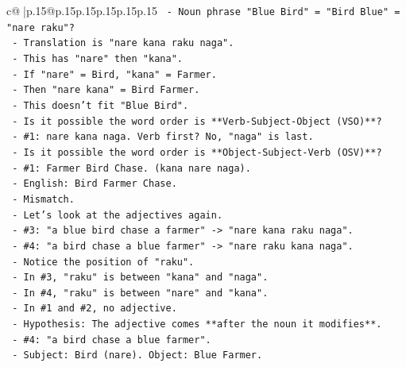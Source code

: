 \documentclass{article}
\begin{document}
{\begin{supertabular}{c@{$\;$}|p{.15\linewidth}@{}p{.15\linewidth}p{.15\linewidth}p{.15\linewidth}p{.15\linewidth}p{.15\linewidth}}
{{{\texttt{                             {-} Noun phrase "Blue Bird" = "Bird Blue" = "nare raku"?} \\
\texttt{                             {-} Translation is "nare kana raku naga".} \\
\texttt{                             {-} This has "nare" then "kana".} \\
\texttt{                             {-} If "nare" = Bird, "kana" = Farmer.} \\
\texttt{                             {-} Then "nare kana" = Bird Farmer.} \\
\texttt{                             {-} This doesn't fit "Blue Bird".} \\
\texttt{                     {-} Is it possible the word order is **Verb{-}Subject{-}Object (VSO)**?} \\
\texttt{                       {-} \#1: nare kana naga. Verb first? No, "naga" is last.} \\
\texttt{                     {-} Is it possible the word order is **Object{-}Subject{-}Verb (OSV)**?} \\
\texttt{                       {-} \#1: Farmer Bird Chase. (kana nare naga).} \\
\texttt{                       {-} English: Bird Farmer Chase.} \\
\texttt{                       {-} Mismatch.} \\
\texttt{                     {-} Let's look at the adjectives again.} \\
\texttt{                       {-} \#3: "a blue bird chase a farmer" {-}> "nare kana raku naga".} \\
\texttt{                       {-} \#4: "a bird chase a blue farmer" {-}> "nare raku kana naga".} \\
\texttt{                       {-} Notice the position of "raku".} \\
\texttt{                       {-} In \#3, "raku" is between "kana" and "naga".} \\
\texttt{                       {-} In \#4, "raku" is between "nare" and "kana".} \\
\texttt{                       {-} In \#1 and \#2, no adjective.} \\
\texttt{                       {-} Hypothesis: The adjective comes **after the noun it modifies**.} \\
\texttt{                         {-} \#4: "a bird chase a blue farmer".} \\
\texttt{                           {-} Subject: Bird (nare). Object: Blue Farmer.} \\
}}}
\end{supertabular}}
\end{document}
